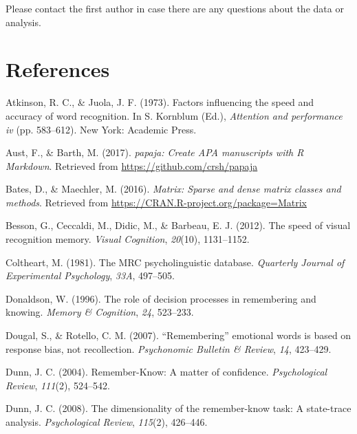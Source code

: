 \documentclass[english,,man,floatsintext]{apa6}
\begin{document}
Please contact the first author in case there are any questions about the data or analysis.

\hypertarget{references}{%
\section{References}\label{references}}

\begingroup
\setlength{\parindent}{-0.5in}
\setlength{\leftskip}{0.5in}

\hypertarget{refs}{}
\leavevmode\hypertarget{ref-Atkinson:Juola:1973}{}%
Atkinson, R. C., \& Juola, J. F. (1973). Factors influencing the speed and accuracy of word recognition. In S. Kornblum (Ed.), \emph{Attention and performance iv} (pp. 583--612). New York: Academic Press.

\leavevmode\hypertarget{ref-R-papaja}{}%
Aust, F., \& Barth, M. (2017). \emph{papaja: Create APA manuscripts with R Markdown}. Retrieved from \url{https://github.com/crsh/papaja}

\leavevmode\hypertarget{ref-R-Matrix}{}%
Bates, D., \& Maechler, M. (2016). \emph{Matrix: Sparse and dense matrix classes and methods}. Retrieved from \url{https://CRAN.R-project.org/package=Matrix}

\leavevmode\hypertarget{ref-Besson:etal:2012}{}%
Besson, G., Ceccaldi, M., Didic, M., \& Barbeau, E. J. (2012). The speed of visual recognition memory. \emph{Visual Cognition}, \emph{20}(10), 1131--1152.

\leavevmode\hypertarget{ref-Coltheart:1981}{}%
Coltheart, M. (1981). The MRC psycholinguistic database. \emph{Quarterly Journal of Experimental Psychology}, \emph{33A}, 497--505.

\leavevmode\hypertarget{ref-Donaldson:1996}{}%
Donaldson, W. (1996). The role of decision processes in remembering and knowing. \emph{Memory \& Cognition}, \emph{24}, 523--233.

\leavevmode\hypertarget{ref-Dougal:Rotello:2007}{}%
Dougal, S., \& Rotello, C. M. (2007). ``Remembering'' emotional words is based on response bias, not recollection. \emph{Psychonomic Bulletin \& Review}, \emph{14}, 423--429.

\leavevmode\hypertarget{ref-Dunn:2004}{}%
Dunn, J. C. (2004). Remember-Know: A matter of confidence. \emph{Psychological Review}, \emph{111}(2), 524--542.

\leavevmode\hypertarget{ref-Dunn:2008}{}%
Dunn, J. C. (2008). The dimensionality of the remember-know task: A state-trace analysis. \emph{Psychological Review}, \emph{115}(2), 426--446.
\end{document}
